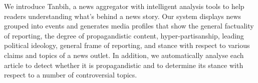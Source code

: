 We introduce Tanbih, a news aggregator with intelligent analysis tools to help readers understanding what's behind a news story. 
Our system displays news grouped into events and generates media profiles that show the general factuality of reporting, the degree of propagandistic content, hyper-partisanship, leading political ideology, general frame of reporting, and stance with respect to various claims and topics of a news outlet. 
In addition, we automatically analyse each article to detect whether it is propagandistic and to determine its stance with respect to a number of controversial topics.